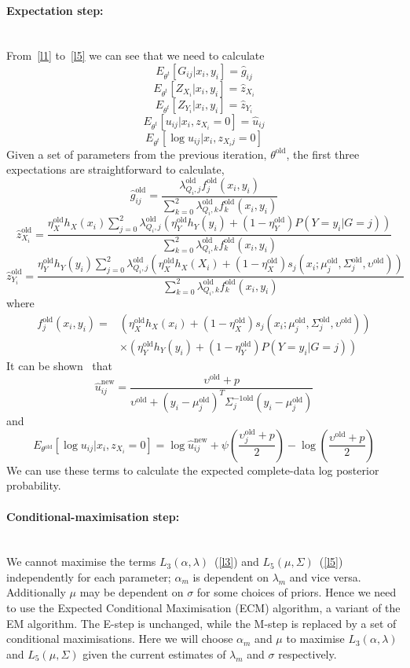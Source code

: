 \paragraph{Expectation step:}~\\
From~\ref{l1} to~\ref{l5} we can see that we need to calculate
$$E_{\theta^t}[G_{ij}|x_i,y_i] = \hat{g}_{ij}$$
$$E_{\theta^t}[Z_{X_i}|x_i,y_i] = \hat{z}_{X_i}$$
$$E_{\theta^t}[Z_{Y_i}|x_i,y_i] = \hat{z}_{Y_i}$$
$$E_{\theta^t}[u_{ij}|x_i,z_{X_i}=0] = \hat{u}_{ij}$$
$$E_{\theta^t}[\log u_{ij}|x_i,z_{X_ij}=0]$$
Given a set of parameters from the previous iteration, $\theta^\textrm{old}$, the first three expectations are straightforward to calculate,
$$\hat{g}^{\textrm{old}}_{ij} = \frac{\lambda^{\textrm{old}}_{Q_i,j} f_j^{\textrm{old}}(x_i,y_i)}{\sum^2_{k=0}\lambda^{\textrm{old}}_{Q_i,k} f_k^{\textrm{old}}(x_i,y_i)}$$
$$\hat{z}^{\textrm{old}}_{X_i} = \frac{\eta_X^{\textrm{old}}h_X(x_i)\sum_{j=0}^2\lambda^{\textrm{old}}_{Q_i,j}\left(\eta_Y^{\textrm{old}}h_Y(y_i) + (1-\eta_Y^{\textrm{old}}) P(Y=y_i|G=j) \right)}{\sum^2_{k=0}\lambda^{\textrm{old}}_{Q_i,k} f_k^{\textrm{old}}(x_i,y_i)}$$
$$\hat{z}^{\textrm{old}}_{Y_i} = \frac{\eta_Y^{\textrm{old}}h_Y(y_i)\sum_{j=0}^2\lambda^{\textrm{old}}_{Q_i,j}\left(\eta_X^{\textrm{old}}h_X(X_i) + (1-\eta_X^{\textrm{old}})s_j(x_i;\mu^{\textrm{old}}_j,\Sigma^{\textrm{old}}_j,\upsilon^{\textrm{old}})\right)}{\sum^2_{k=0}\lambda^{\textrm{old}}_{Q_i,k} f_k^{\textrm{old}}(x_i,y_i)}$$
where 
\begin{eqnarray}
f_j^{\textrm{old}}(x_i,y_i) = & \left( \eta_X^{\textrm{old}} h_X(x_i) + (1-\eta_X^{\textrm{old}}) 
s_j(x_i;\mu^{\textrm{old}}_j,\Sigma^{\textrm{old}}_j,\upsilon^{\textrm{old}}) \right) \nonumber\\
&\times \left(\eta_Y^{\textrm{old}}h_Y(y_i) + (1-\eta_Y^{\textrm{old}})P(Y=y_i|G=j)\right)\nonumber
\end{eqnarray}
It can be shown~\citep{peel2000robust} that 
$$\hat{u}^{\textrm{new}}_{ij}  = \frac{\upsilon^{\textrm{old}} + p }{\upsilon^{\textrm{old}} + (y_i - \mu_j^{\textrm{old}})^T\Sigma_j^{-1 \textrm{old}}(y_i - \mu_j^{\textrm{old}})}$$
and
$$E_{\theta^{\textrm{old}}}[\log u_{ij}|x_i,z_{X_i}=0] = \log\hat{u}^{\textrm{new}}_{ij} + \psi \left( \frac{\upsilon^{\textrm{old}}_j+p}{2} \right) - \log \left(\frac{\upsilon^{\textrm{old}}+p}{2} \right)$$
We can use these terms to calculate the expected complete-data log posterior probability.  
\paragraph{Conditional-maximisation step:}~\\
We cannot maximise the terms $L_3(\alpha,\lambda)$~(\ref{l3}) and $L_5(\mu,\Sigma)$~(\ref{l5}) independently for each parameter; $\alpha_m$ is dependent on $\lambda_m$ and vice versa.  Additionally $\mu$ may be dependent on $\sigma$ for some choices of priors. Hence we need to use the Expected Conditional Maximisation (ECM) algorithm, a variant of the EM algorithm.  The E-step is unchanged, while the M-step is replaced by a set of conditional maximisations.  Here we will choose $\alpha_m$ and $\mu$ to maximise $L_3(\alpha,\lambda)$ and $L_5(\mu,\Sigma)$ given the current estimates of $\lambda_m$ and $\sigma$ respectively.


